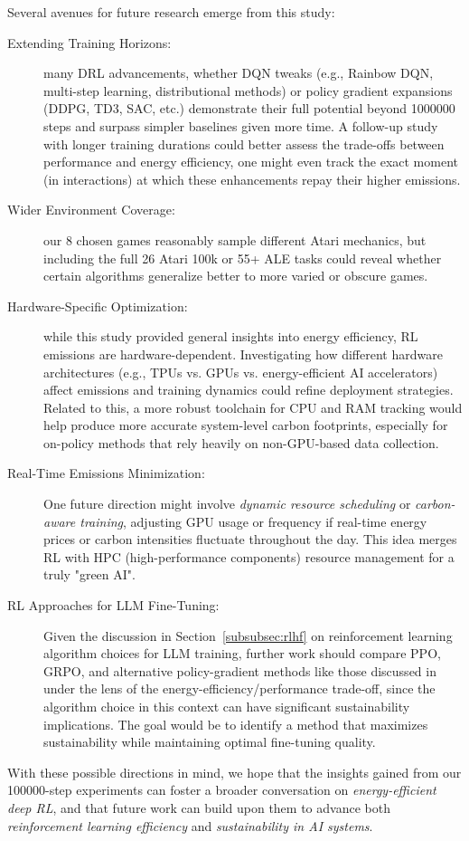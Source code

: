 Several avenues for future research emerge from this study:

\begin{description}
	\item[Extending Training Horizons:] many DRL advancements, whether DQN tweaks (e.g., Rainbow DQN, multi-step learning, distributional methods) or policy gradient expansions (DDPG, TD3, SAC, etc.) demonstrate their full potential beyond \num{1000000} steps and surpass simpler baselines given more time. A follow-up study with longer training durations could better assess the trade-offs between performance and energy efficiency, one might even track the exact moment (in interactions) at which these enhancements repay their higher emissions.
	
	\item[Wider Environment Coverage:] our 8 chosen games reasonably sample different Atari mechanics, but including the full 26 Atari 100k or 55+ ALE tasks could reveal whether certain algorithms generalize better to more varied or obscure games.
	
	\item[Hardware-Specific Optimization:] while this study provided general insights into energy efficiency, RL emissions are hardware-dependent. Investigating how different hardware architectures (e.g., TPUs vs. GPUs vs. energy-efficient AI accelerators) affect emissions and training dynamics could refine deployment strategies. Related to this, a more robust toolchain for CPU and RAM tracking would help produce more accurate system-level carbon footprints, especially for on-policy methods that rely heavily on non-GPU-based data collection.
		
	\item[Real-Time Emissions Minimization:] One future direction might involve \emph{dynamic resource scheduling} or 
	\emph{carbon-aware training}, adjusting GPU usage or frequency if real-time energy prices or carbon intensities fluctuate throughout the day. This idea merges RL with HPC (high-performance components) resource management for a truly "green AI".
	
	\item[RL Approaches for LLM Fine-Tuning:] Given the discussion in Section~\ref{subsubsec:rlhf} on reinforcement learning algorithm choices for LLM training, further work should compare PPO, GRPO, and alternative policy-gradient methods like those discussed in~\cite{ahmadian:back_to_basics} under the lens of the energy-efficiency/performance trade-off, since the algorithm choice in this context can have significant sustainability implications. The goal would be to identify a method that maximizes sustainability while maintaining optimal fine-tuning quality.
\end{description}

With these possible directions in mind, we hope that the insights gained from our \num{100000}-step experiments can foster a broader conversation on \emph{energy-efficient deep RL}, and that future work can build upon them to advance both \emph{reinforcement learning efficiency} and \emph{sustainability in AI systems}.
